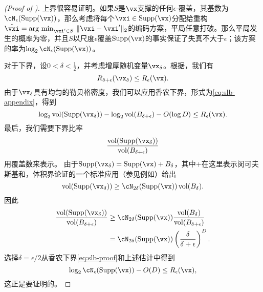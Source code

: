 \documentclass[../../book-main_zh.tex]{subfiles}
\begin{document}
\begin{proof}[(Proof of )]
    上界很容易证明。如果$S$是$\vx$支撑的任何$\epsilon$-覆盖，其基数为$\cN_{\epsilon}(\Supp(\vx))$，那么考虑将每个$\vxi \in \Supp(\vx)$分配给重构$\hat{\vxi} = \argmin_{\vxi' \in S}\, \norm{\vxi - \vxi'}_2$的编码方案，平局任意打破。那么平局发生的概率为零，并且$S$以尺度$\epsilon$覆盖$\Supp(\vx)$的事实保证了失真不大于$\epsilon$；该方案的率为$\log_2 \cN_{\epsilon}(\Supp(\vx))$。

    对于下界，设$0 < \delta < \tfrac{1}{2}$，并考虑增厚随机变量$\vx_{\delta}$。根据，我们有
    \begin{equation}
        R_{\delta + \epsilon}(\vx_{\delta})
        \leq
        R_{\epsilon}(\vx).
    \end{equation}
    由于$\vx_{\delta}$具有均匀的勒贝格密度，我们可以应用香农下界，形式为\eqref{eq:slb-appendix}，得到
    \begin{equation}\label{eq:slb-proof}
        \log_2 \volume(\Supp(\vx_{\delta}))
        - \log_2 \volume(B_{\delta + \epsilon})
        - O(\log D)
        \leq
        R_{\epsilon}(\vx).
    \end{equation}
    最后，我们需要下界比率
    \begin{equation}
        \frac{
            \volume(\Supp(\vx_{\delta}))
        }
        {
            \volume(B_{\delta + \epsilon})
        }
    \end{equation}
    用覆盖数来表示。
    由于$\Supp(\vx_{\delta}) = \Supp(\vx) + B_{\delta}$，其中$+$在这里表示闵可夫斯基和，体积界论证的一个标准应用（参见例如\cite[命题 4.2.12]{Vershynin2018-br}）给出
    \begin{equation}
        \volume(\Supp(\vx_{\delta}))
        \geq
        \cN_{2\delta}(\Supp(\vx))
        \volume(B_{\delta}).
    \end{equation}
    因此
    \begin{align}
        \frac{
            \volume(\Supp(\vx_{\delta}))
        }
        {
            \volume(B_{\delta + \epsilon})
        }
        &\geq
        \cN_{2\delta}(\Supp(\vx))
        \frac{
            \volume(B_{\delta})
        }
        {
            \volume(B_{\delta + \epsilon})
        }
        \\
        &=
        \cN_{2\delta}(\Supp(\vx))
        \left(
            \frac{
                \delta
            } 
            {
                \delta + \epsilon
            }
        \right)^D.
    \end{align}
    选择$\delta = \epsilon / 2$从香农下界\eqref{eq:slb-proof}和上述估计中得到
    \begin{equation}
        \log_2 \cN_{\epsilon}(\Supp(\vx))
        - O(D)
        \leq
        R_{\epsilon}(\vx),
    \end{equation}
    这正是要证明的。

\end{proof}
\end{document}
